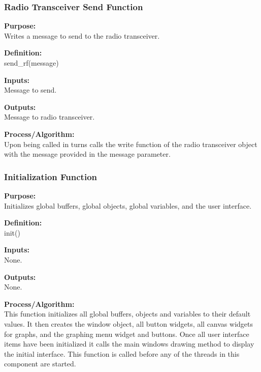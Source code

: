 \documentclass[10pt,draftclsnofoot,onecolumn,compsoc]{IEEEtran}
\begin{document}
\subsubsection{Radio Transceiver Send Function}
{\bf Purpose:} \\
Writes a message to send to the radio transceiver. \par
{\bf Definition:} \\ 
send\_rf(message) \par
{\bf Inputs:} \\  Message to send. \par
{\bf Outputs:} \\ Message to radio transceiver. \par
{\bf Process/Algorithm:} \\
Upon being called in turns calls the write function of the radio transceiver object with the message provided in the message parameter. \par

\subsubsection{Initialization Function}
{\bf Purpose:} \\
Initializes global buffers, global objects, global variables, and the user interface. \par
{\bf Definition:} \\ 
init() \par
{\bf Inputs:} \\ None. \par
{\bf Outputs:} \\None. \par
{\bf Process/Algorithm:} \\
This function initializes all global buffers, objects and variables to their default values. It then creates the window object, all button widgets, all canvas widgets for graphs, and the graphing menu widget and buttons. Once all user interface items have been initialized it calls the main windows drawing method to display the initial interface. This function is called before any of the threads in this component are started. \par
\end{document}
